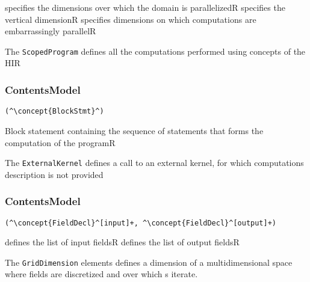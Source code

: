 \begin{HIRChildElements}
	{specifies the dimensions over which the domain is parallelized}{R}
	{specifies the vertical dimension}{R}
	{specifies dimensions on which computations are embarrassingly parallel}{R}	
\end{HIRChildElements}


The {\tt ScopedProgram} defines all the computations performed using concepts of the HIR

\subsubsection*{ContentsModel}{}

\begin{lstlisting}[style=default]
(^\concept{BlockStmt}^)
\end{lstlisting}

\begin{HIRChildElements}
	{Block statement containing the sequence of statements that forms the computation of the program}{R}
\end{HIRChildElements}


The {\tt ExternalKernel} defines a call to an external kernel, for which computations description is not provided

\subsubsection*{ContentsModel}{}

\begin{lstlisting}[style=default]
(^\concept{FieldDecl}^[input]+, ^\concept{FieldDecl}^[output]+)
\end{lstlisting}

\begin{HIRChildElements}
	{defines the list of input fields}{R}
	{defines the list of output fields}{R}
		
\end{HIRChildElements}


The {\tt GridDimension} elements defines a dimension of a multidimensional space where fields are discretized and over which s iterate. 

